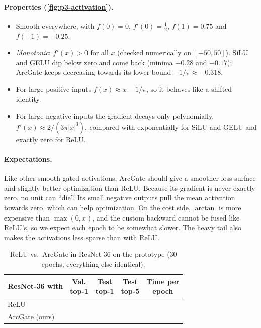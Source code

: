 \paragraph{Properties (\cref{fig:p3-activation}).}
\begin{itemize}[nosep,leftmargin=*]
  \item Smooth everywhere, with $f(0)=0$, $f'(0)=\tfrac12$, $f(1)=0.75$ and $f(-1)=-0.25$.
  \item \emph{Monotonic}: $f'(x)>0$ for all $x$ (checked numerically on $[-50,50]$). SiLU and GELU dip below zero and come back (minima $-0.28$ and $-0.17$); ArcGate keeps decreasing towards its lower bound $-1/\pi\approx-0.318$.
  \item For large positive inputs $f(x)\approx x-1/\pi$, so it behaves like a shifted identity.
  \item For large negative inputs the gradient decays only polynomially, $f'(x)\approx 2/(3\pi|x|^3)$, compared with exponentially for SiLU and GELU and exactly zero for ReLU.
\end{itemize}

\paragraph{Expectations.}
Like other smooth gated activations, ArcGate should give a smoother loss surface and slightly better optimization than ReLU.
Because its gradient is never exactly zero, no unit can ``die''.
Its small negative outputs pull the mean activation towards zero, which can help optimization.
On the cost side, $\arctan$ is more expensive than $\max(0,x)$, and the custom backward cannot be fused like ReLU's, so we expect each epoch to be somewhat slower.
The heavy tail also makes the activations less sparse than with ReLU.

\begin{table}[t]
  \centering
  \small
  \setlength{\tabcolsep}{4pt}
  \begin{tabular}{@{}lcccc@{}}
    \toprule
    ResNet-36 with & \makecell{Val.\\top-1} & \makecell{Test\\top-1} & \makecell{Test\\top-5} & \makecell{Time per\\epoch} \\
    \midrule
    ReLU & \todo{--} & \todo{--} & \todo{--} & \todo{--} \\
    ArcGate (ours) & \todo{--} & \todo{--} & \todo{--} & \todo{--} \\
    \bottomrule
  \end{tabular}
  \caption{ReLU vs.\ ArcGate in ResNet-36 on the prototype (30 epochs, everything else identical). }
  \label{tab:p3-act}
\end{table}

